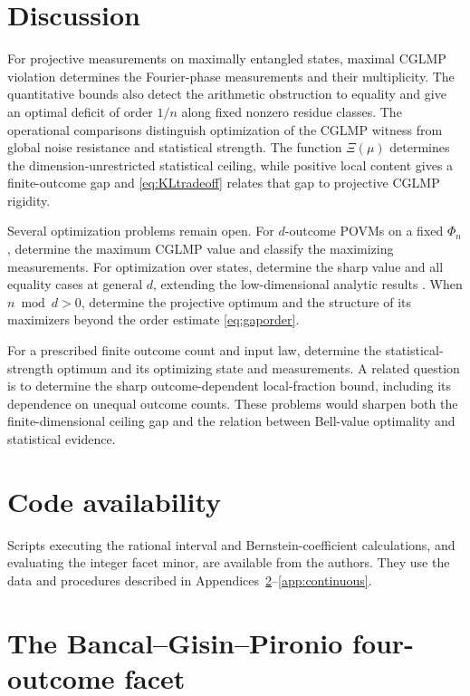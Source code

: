 \documentclass[11pt]{amsart}
\theoremstyle{remark}
\theoremstyle{plain}
\numberwithin{equation}{section}
\begin{document}
\section{Discussion}\label{sec:discussion}

For projective measurements on maximally entangled states, maximal
CGLMP violation determines the Fourier-phase measurements and their
multiplicity.
The quantitative bounds also detect the arithmetic obstruction to
equality and give an optimal deficit of order \(1/n\) along fixed
nonzero residue classes.
The operational comparisons distinguish optimization of the CGLMP
witness from global noise resistance and statistical strength.
The function \(\Xi(\mu)\) determines the dimension-unrestricted
statistical ceiling, while positive local content gives a finite-outcome
gap and \eqref{eq:KLtradeoff} relates that gap to projective CGLMP
rigidity.

Several optimization problems remain open. For \(d\)-outcome POVMs
on a fixed \(\Phi_n\), determine the maximum CGLMP value and classify
the maximizing measurements. For optimization over states, determine
the sharp value and all equality cases at general \(d\), extending
the low-dimensional analytic results \cite{IR}.
When \(n\bmod d>0\), determine the projective optimum and the
structure of its maximizers beyond the order estimate
\eqref{eq:gaporder}.

For a prescribed finite outcome count and input law, determine the
statistical-strength optimum and its optimizing state and
measurements. A related question is to determine the sharp
outcome-dependent local-fraction bound, including its dependence
on unequal outcome counts. These problems would sharpen both the
finite-dimensional ceiling gap and the relation between Bell-value
optimality and statistical evidence.

\section*{Code availability}

Scripts executing the rational interval and Bernstein-coefficient
calculations, and evaluating the integer facet minor, are available
from the authors. They use the data and procedures described in
Appendices~\ref{app:facet}--\ref{app:continuous}.

\appendix

\section{The Bancal--Gisin--Pironio four-outcome facet}\label{app:facet}
\end{document}
